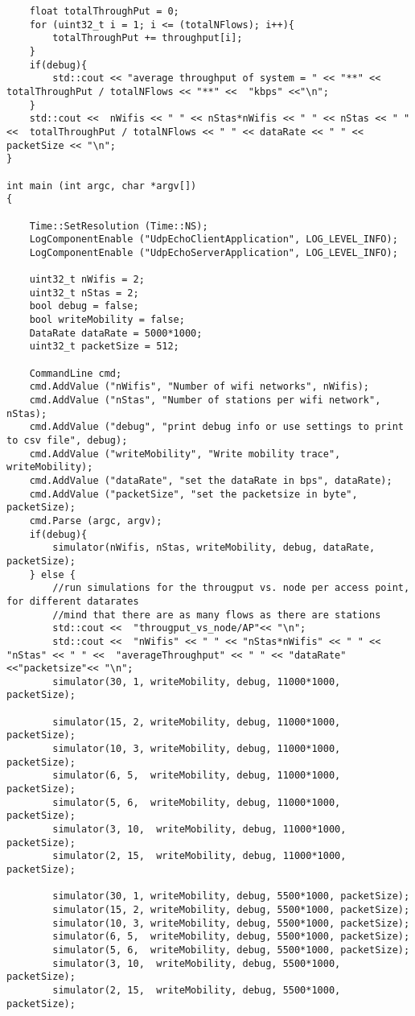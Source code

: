 \begin{lstlisting}
	float totalThroughPut = 0;
	for (uint32_t i = 1; i <= (totalNFlows); i++){
		totalThroughPut += throughput[i];
	}
	if(debug){
		std::cout << "average throughput of system = " << "**" << totalThroughPut / totalNFlows << "**" <<  "kbps" <<"\n";
	}
	std::cout <<  nWifis << " " << nStas*nWifis << " " << nStas << " " <<  totalThroughPut / totalNFlows << " " << dataRate << " " << packetSize << "\n";
}

int main (int argc, char *argv[])
{

	Time::SetResolution (Time::NS);
	LogComponentEnable ("UdpEchoClientApplication", LOG_LEVEL_INFO);
	LogComponentEnable ("UdpEchoServerApplication", LOG_LEVEL_INFO);
	
	uint32_t nWifis = 2;
	uint32_t nStas = 2;
	bool debug = false;
	bool writeMobility = false;
	DataRate dataRate = 5000*1000;
	uint32_t packetSize = 512;
	
	CommandLine cmd;
	cmd.AddValue ("nWifis", "Number of wifi networks", nWifis);
	cmd.AddValue ("nStas", "Number of stations per wifi network", nStas);
	cmd.AddValue ("debug", "print debug info or use settings to print to csv file", debug);
	cmd.AddValue ("writeMobility", "Write mobility trace", writeMobility);
	cmd.AddValue ("dataRate", "set the dataRate in bps", dataRate);
	cmd.AddValue ("packetSize", "set the packetsize in byte", packetSize);
	cmd.Parse (argc, argv);
	if(debug){
		simulator(nWifis, nStas, writeMobility, debug, dataRate, packetSize);
	} else {
		//run simulations for the througput vs. node per access point, for different datarates
		//mind that there are as many flows as there are stations
		std::cout <<  "througput_vs_node/AP"<< "\n";
		std::cout <<  "nWifis" << " " << "nStas*nWifis" << " " << "nStas" << " " <<  "averageThroughput" << " " << "dataRate" <<"packetsize"<< "\n";
		simulator(30, 1, writeMobility, debug, 11000*1000, packetSize);
		
		simulator(15, 2, writeMobility, debug, 11000*1000, packetSize);
		simulator(10, 3, writeMobility, debug, 11000*1000, packetSize);
		simulator(6, 5,  writeMobility, debug, 11000*1000, packetSize);
		simulator(5, 6,  writeMobility, debug, 11000*1000, packetSize);
		simulator(3, 10,  writeMobility, debug, 11000*1000, packetSize);
		simulator(2, 15,  writeMobility, debug, 11000*1000, packetSize);
		
		simulator(30, 1, writeMobility, debug, 5500*1000, packetSize);
		simulator(15, 2, writeMobility, debug, 5500*1000, packetSize);
		simulator(10, 3, writeMobility, debug, 5500*1000, packetSize);
		simulator(6, 5,  writeMobility, debug, 5500*1000, packetSize);
		simulator(5, 6,  writeMobility, debug, 5500*1000, packetSize);
		simulator(3, 10,  writeMobility, debug, 5500*1000, packetSize);
		simulator(2, 15,  writeMobility, debug, 5500*1000, packetSize);
		

\end{lstlisting}
